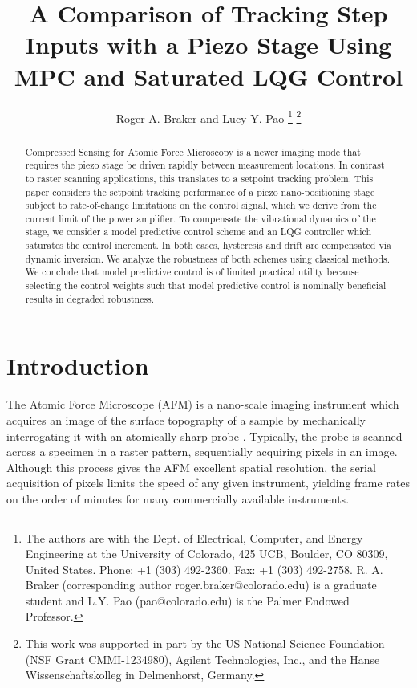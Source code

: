 \documentclass[twocolumn,twoside]{IEEEtran}
\begin{document}
\title{A Comparison of Tracking Step Inputs with a Piezo Stage Using MPC and Saturated LQG Control}
\author{Roger A. Braker and Lucy Y. Pao
  \thanks{The authors are with the Dept. of Electrical, Computer, and Energy Engineering at the University of Colorado, 425 UCB, Boulder, CO 80309, United States. Phone: +1 (303) 492-2360. Fax: +1 (303) 492-2758.
    R. A.  Braker (corresponding author roger.braker@colorado.edu) is a graduate student and
    L.Y. Pao (pao@colorado.edu) is the Palmer Endowed Professor.}
  \thanks{This work was supported in part by the US National Science Foundation (NSF Grant CMMI-1234980), Agilent Technologies, Inc., and the Hanse Wissenschaftskolleg in Delmenhorst, Germany.}
}

\maketitle
\begin{abstract}
  Compressed Sensing for Atomic Force Microscopy is a newer imaging mode that requires the piezo stage be driven rapidly between measurement locations. In contrast to raster scanning applications, this translates to a setpoint tracking problem. 
  This paper considers the setpoint tracking performance of a piezo nano-positioning stage subject to rate-of-change limitations on the control signal, which we derive from the current limit of the power amplifier.
To compensate the vibrational dynamics of the stage, we consider a model predictive control scheme and an LQG controller which saturates the control increment. In both cases, hysteresis and drift are compensated via dynamic inversion. We analyze the robustness of both schemes using classical methods. We conclude that model predictive control is of limited practical utility because selecting the control weights such that model predictive control is nominally beneficial results in degraded robustness.
\end{abstract}


\section{Introduction}\label{sec:intro}

The Atomic Force Microscope (AFM) is a nano-scale imaging instrument which acquires an image of the surface topography of a sample by mechanically interrogating it with an atomically-sharp probe \cite{abramovitch_tutorial_2007, rana_improvement_survey_2017}. Typically, the probe is scanned across a specimen in a raster pattern, sequentially acquiring pixels in an image. Although this process gives the AFM excellent spatial resolution, the serial acquisition of pixels limits the speed of any given instrument, yielding frame rates on the order of minutes for many commercially available instruments.
\end{document}
